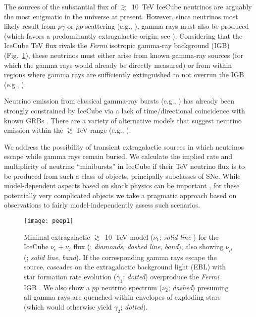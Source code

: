 \documentclass[aps,prd,nofootinbib,twocolumn,floatfix,letterpaper,superscriptaddress,showpacs]{revtex4}
\begin{document}
The sources of the substantial flux of $\gtrsim$~10~TeV IceCube neutrinos are arguably the most enigmatic in the universe at present.  However, since neutrinos most likely result from $p \gamma$ or $pp$ scattering (e.g., \cite{Berezinsky:1975zz,Eichler:1978zn,Stecker:1978ah,Gaisser:1994yf,Waxman:1998yy,Learned:2000sw,Becker:2007sv}), gamma rays must also be produced (which favors a predominantly extragalactic origin; see \cite{Kistler2015d}).  Considering that the IceCube TeV flux rivals the {\it Fermi} isotropic gamma-ray background (IGB) \cite{Ackermann2015} (Fig.~\ref{casca}), these neutrinos must either arise from known gamma-ray sources (for which the gamma rays would already be directly measured) or from within regions where gamma rays are sufficiently extinguished to not overrun the IGB (e.g., \cite{Berezinsky:1980mh,Stecker:1991vm,Mannheim2001,Kistler2014,Murase2013,Murase2015b,Kistler2015c}).

Neutrino emission from classical gamma-ray bursts (e.g., \cite{Waxman97,Waxman2000,Dermer03,Vietri,Paczynski,Rachen,Alvarez,Dai,Nagataki,Asano,Becker06,Baerwald:2013pu,Murase2013b,Tamborra:2015qza}) has already been strongly constrained by IceCube via a lack of time/directional coincidence with known GRBs \cite{Abbasi:2012zw,Aartsen:2014aqy}.  There are a variety of alternative models that suggest neutrino emission within the $\gtrsim\,$TeV range (e.g., \cite{Meszaros:2001ms,Razzaque2004,Ando2005,Horiuchi2008,Enberg:2008jm,Bhattacharya:2014sta,Tamborra:2015fzv}).

We address the possibility of transient extragalactic sources in which neutrinos escape while gamma rays remain buried.  We calculate the implied rate and multiplicity of neutrino ``minibursts'' in IceCube if their TeV neutrino flux is to be produced from such a class of objects, principally subclasses of SNe.  While model-dependent aspects based on shock physics can be important \cite{Meszaros:2015krr}, for these potentially very complicated objects we take a pragmatic approach based on observations to fairly model-independently assess such scenarios.


\begin{figure}[b!]\vspace*{-0.5cm}
\hspace*{-0.25cm}
\texttt{[image: peep1]}
\vspace*{-0.7cm}
\caption{Minimal extragalactic $\gtrsim$~10~TeV model ($\nu_1$; {\it solid line} \cite{Kistler2015c}) for the IceCube $\nu_e \!+\! \nu_\tau$ flux (\cite{Niederhausen2015}; {\it diamonds}, {\it dashed line}, {\it band}), also showing $\nu_\mu$ (\cite{Aartsen:2016xlq}; {\it solid line}, {\it band}).
If the corresponding gamma rays escape the source, cascades on the extragalactic background light (EBL) with star formation rate evolution ($\gamma_1$; {\it dotted}) overproduce the {\it Fermi} IGB \cite{Ackermann2015}.  We also show a $pp$ neutrino spectrum ($\nu_2$; {\it dashed}) presuming all gamma rays are quenched within envelopes of exploding stars (which would otherwise yield $\gamma_2$; {\it dotted}).
\label{casca}}
\end{figure}
\end{document}
